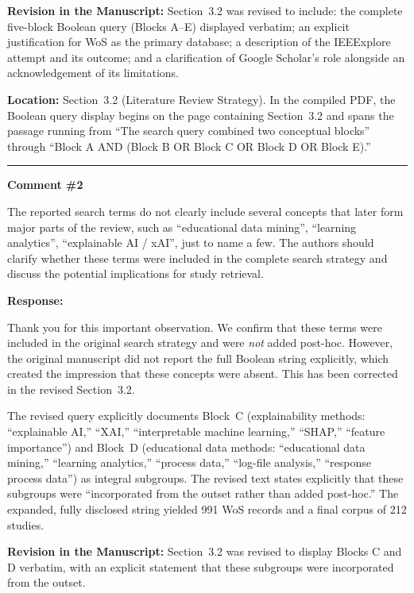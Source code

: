 \documentclass[12pt, a4paper]{article}
\begin{document}
\medskip
\noindent\textbf{Revision in the Manuscript:}
Section~3.2 was revised to include: the complete five-block Boolean query (Blocks A--E) displayed
verbatim; an explicit justification for WoS as the primary database; a description of the
IEEExplore attempt and its outcome; and a clarification of Google Scholar's role alongside an
acknowledgement of its limitations.

\medskip
\noindent\textbf{Location:} Section~3.2 (Literature Review Strategy). In the compiled PDF, the
Boolean query display begins on the page containing Section~3.2 and spans the passage running from
``The search query combined two conceptual blocks'' through ``Block A AND (Block B OR Block C OR
Block D OR Block E).''

\bigskip\hrule\bigskip

\noindent\textbf{Comment \#2}

\medskip
\noindent\textcolor{reviewerblue}{%
The reported search terms do not clearly include several concepts that later form major parts of
the review, such as ``educational data mining'', ``learning analytics'', ``explainable AI / xAI'',
just to name a few. The authors should clarify whether these terms were included in the complete
search strategy and discuss the potential implications for study retrieval.}

\medskip
\noindent\textbf{Response:}

Thank you for this important observation. We confirm that these terms were included in the original
search strategy and were \emph{not} added post-hoc. However, the original manuscript did not
report the full Boolean string explicitly, which created the impression that these concepts were
absent. This has been corrected in the revised Section~3.2.

The revised query explicitly documents Block~C (explainability methods: ``explainable AI,'' ``XAI,''
``interpretable machine learning,'' ``SHAP,'' ``feature importance'') and Block~D (educational data
methods: ``educational data mining,'' ``learning analytics,'' ``process data,'' ``log-file
analysis,'' ``response process data'') as integral subgroups. The revised text states explicitly
that these subgroups were ``incorporated from the outset rather than added post-hoc.'' The expanded,
fully disclosed string yielded 991 WoS records and a final corpus of 212 studies.

\medskip
\noindent\textbf{Revision in the Manuscript:}
Section~3.2 was revised to display Blocks C and D verbatim, with an explicit statement that these
subgroups were incorporated from the outset.
\end{document}
